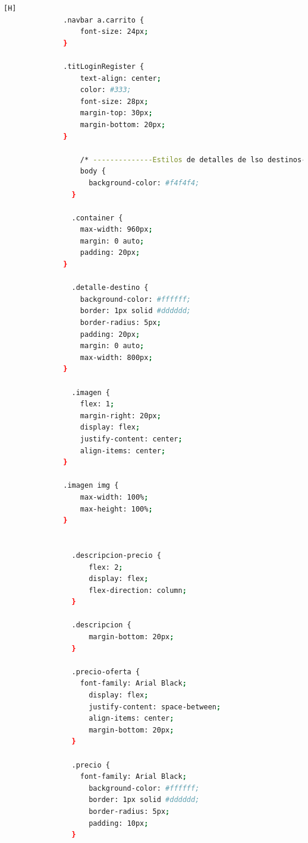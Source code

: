 \documentclass{article}
\begin{document}
\begin{lstlisting}[language=bash,caption={styles.css}][H]
              .navbar a.carrito {
                  font-size: 24px;
              }
              
              .titLoginRegister {
                  text-align: center;
                  color: #333;
                  font-size: 28px;
                  margin-top: 30px;
                  margin-bottom: 20px;
              }
              
                  /* --------------Estilos de detalles de lso destinos--------------- */
                  body {
                    background-color: #f4f4f4;
                }
                
                .container {
                  max-width: 960px;
                  margin: 0 auto;
                  padding: 20px;
              }
                
                .detalle-destino {
                  background-color: #ffffff;
                  border: 1px solid #dddddd;
                  border-radius: 5px;
                  padding: 20px;
                  margin: 0 auto;
                  max-width: 800px;
              }
                
                .imagen {
                  flex: 1;
                  margin-right: 20px;
                  display: flex;
                  justify-content: center;
                  align-items: center;
              }
              
              .imagen img {
                  max-width: 100%;
                  max-height: 100%;
              }
              
                
                .descripcion-precio {
                    flex: 2;
                    display: flex;
                    flex-direction: column;
                }
                
                .descripcion {
                    margin-bottom: 20px;
                }
                
                .precio-oferta {
                  font-family: Arial Black;
                    display: flex;
                    justify-content: space-between;
                    align-items: center;
                    margin-bottom: 20px;
                }
                
                .precio {
                  font-family: Arial Black;
                    background-color: #ffffff;
                    border: 1px solid #dddddd;
                    border-radius: 5px;
                    padding: 10px;
                }
                

\end{lstlisting}
\end{document}
